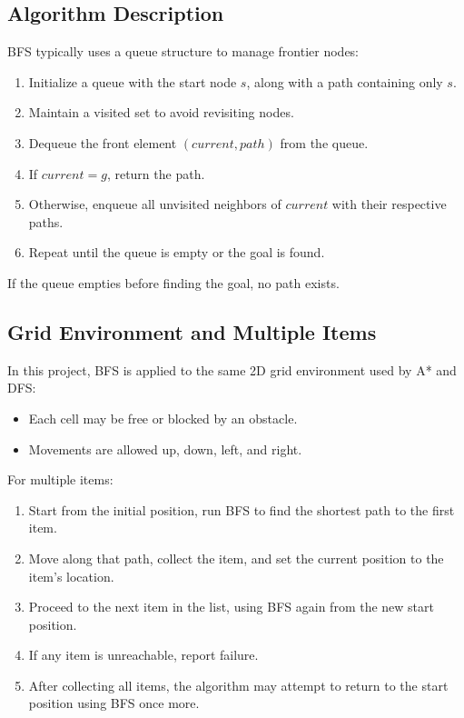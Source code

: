 \documentclass[12pt]{article}
\begin{document}
\subsection{Algorithm Description}
BFS typically uses a queue structure to manage frontier nodes:
\begin{enumerate}
    \item Initialize a queue with the start node \( s \), along with a path containing only \( s \).
    \item Maintain a visited set to avoid revisiting nodes.
    \item Dequeue the front element \((current, path)\) from the queue.
    \item If \( current = g \), return the path.
    \item Otherwise, enqueue all unvisited neighbors of \( current \) with their respective paths.
    \item Repeat until the queue is empty or the goal is found.
\end{enumerate}

\noindent If the queue empties before finding the goal, no path exists.

\subsection{Grid Environment and Multiple Items}
In this project, BFS is applied to the same 2D grid environment used by A* and DFS:
\begin{itemize}
    \item Each cell may be free or blocked by an obstacle.
    \item Movements are allowed up, down, left, and right.
\end{itemize}

\noindent For multiple items:
\begin{enumerate}
    \item Start from the initial position, run BFS to find the shortest path to the first item.
    \item Move along that path, collect the item, and set the current position to the item's location.
    \item Proceed to the next item in the list, using BFS again from the new start position.
    \item If any item is unreachable, report failure.
    \item After collecting all items, the algorithm may attempt to return to the start position using BFS once more.
\end{enumerate}
\end{document}

